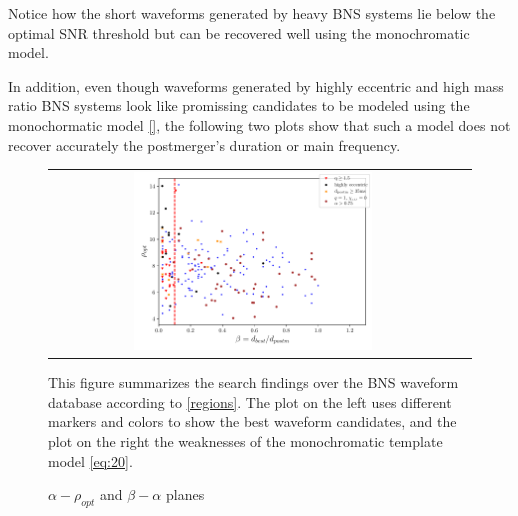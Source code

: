 \newpage
Notice how the short waveforms generated by heavy BNS systems lie below the optimal SNR threshold but can be recovered well using the monochromatic model.

In addition, even though waveforms generated by highly eccentric and high mass ratio BNS systems look like promissing candidates to be modeled using the monochormatic model \ref{}, the following two plots show that such a model does not recover accurately the postmerger's duration or main frequency.

\begin{figure}[hbt!]
\begin{center}
\begin{tabular}{cc}
\includegraphics[width=0.6\textwidth, angle=0]{images/Data_analysis/results/alpha_sum1.pdf}
\end{tabular}
\end{center}
\caption{$\alpha - \rho_{opt}$ and $\beta - \alpha$  planes}
This figure summarizes the search findings over the BNS waveform database according to \ref{regions}. The plot on the left uses different markers and colors to show the best waveform candidates, and the plot on the right the weaknesses of the monochromatic template model \ref{eq:20}.
\end{figure}

\FloatBarrier

